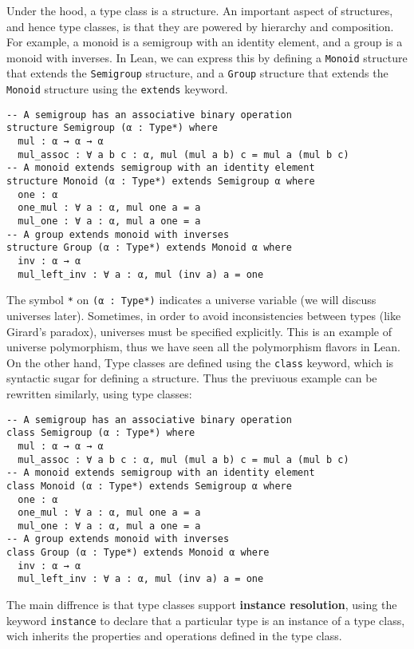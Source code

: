 Under the hood, a type class is a structure. An important aspect of structures,
and hence type classes, is that they are powered by hierarchy and composition.
For example, a monoid is a semigroup with an identity element, and a group is a monoid with inverses. In Lean, we can express this
by defining a \lstinline[language=lean]|Monoid| structure that extends 
the \lstinline[language=lean]|Semigroup| structure, 
and a \lstinline[language=lean]|Group| structure 
that extends the \lstinline[language=lean]|Monoid| structure
using the \lstinline[language=lean]|extends| keyword.

\begin{lstlisting}[language=lean]
-- A semigroup has an associative binary operation
structure Semigroup (α : Type*) where
  mul : α → α → α
  mul_assoc : ∀ a b c : α, mul (mul a b) c = mul a (mul b c)
-- A monoid extends semigroup with an identity element  
structure Monoid (α : Type*) extends Semigroup α where
  one : α
  one_mul : ∀ a : α, mul one a = a
  mul_one : ∀ a : α, mul a one = a  
-- A group extends monoid with inverses
structure Group (α : Type*) extends Monoid α where
  inv : α → α
  mul_left_inv : ∀ a : α, mul (inv a) a = one     
\end{lstlisting}

The symbol \lstinline[language=lean]|*| on  \lstinline[language=lean]|(α : Type*)| 
indicates a universe variable (we will discuss universes later). Sometimes, 
in order to avoid
inconsistencies between types (like Girard's paradox), universes must be specified explicitly. 
This is an example
of universe polymorphism, thus we have seen all the polymorphism flavors in Lean.
On the other hand, Type classes are defined using the \lstinline[language=lean]|class| keyword, 
which is syntactic sugar for defining a structure.
Thus the previuous example can be rewritten similarly, using type classes:
\begin{lstlisting}[language=lean]
-- A semigroup has an associative binary operation
class Semigroup (α : Type*) where
  mul : α → α → α
  mul_assoc : ∀ a b c : α, mul (mul a b) c = mul a (mul b c)
-- A monoid extends semigroup with an identity element  
class Monoid (α : Type*) extends Semigroup α where
  one : α
  one_mul : ∀ a : α, mul one a = a
  mul_one : ∀ a : α, mul a one = a  
-- A group extends monoid with inverses
class Group (α : Type*) extends Monoid α where
  inv : α → α
  mul_left_inv : ∀ a : α, mul (inv a) a = one     
\end{lstlisting}
The main diffrence is that type classes support \textbf{instance resolution}, using the keyword 
\lstinline[language=lean]|instance| to declare that a particular type is an instance of a type class, 
wich inherits 
the properties and operations defined in the type class.

